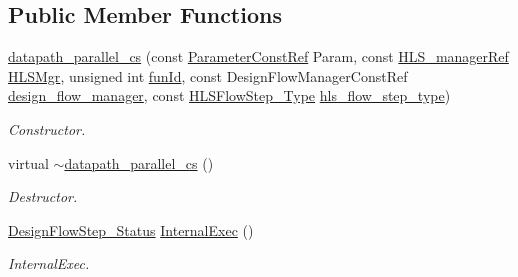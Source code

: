 \subsection*{Public Member Functions}
\begin{DoxyCompactItemize}
\item 
\hyperlink{classdatapath__parallel__cs_ae38b414a0819ea8ddd0ed31d7f10e3b7}{datapath\+\_\+parallel\+\_\+cs} (const \hyperlink{Parameter_8hpp_a37841774a6fcb479b597fdf8955eb4ea}{Parameter\+Const\+Ref} Param, const \hyperlink{hls__manager_8hpp_acd3842b8589fe52c08fc0b2fcc813bfe}{H\+L\+S\+\_\+manager\+Ref} \hyperlink{classHLS__step_ade85003a99d34134418451ddc46a18e9}{H\+L\+S\+Mgr}, unsigned int \hyperlink{classHLSFunctionStep_a3e6434fd86c698b0c70520b859bff5b0}{fun\+Id}, const Design\+Flow\+Manager\+Const\+Ref \hyperlink{classDesignFlowStep_ab770677ddf087613add30024e16a5554}{design\+\_\+flow\+\_\+manager}, const \hyperlink{hls__step_8hpp_ada16bc22905016180e26fc7e39537f8d}{H\+L\+S\+Flow\+Step\+\_\+\+Type} \hyperlink{classHLS__step_aefd59af15346ec3f10bf12bd756e6777}{hls\+\_\+flow\+\_\+step\+\_\+type})
\begin{DoxyCompactList}\small\item\em Constructor. \end{DoxyCompactList}\item 
virtual \hyperlink{classdatapath__parallel__cs_a6af0c1233e253a225e37aa2f1677524b}{$\sim$datapath\+\_\+parallel\+\_\+cs} ()
\begin{DoxyCompactList}\small\item\em Destructor. \end{DoxyCompactList}\item 
\hyperlink{design__flow__step_8hpp_afb1f0d73069c26076b8d31dbc8ebecdf}{Design\+Flow\+Step\+\_\+\+Status} \hyperlink{classdatapath__parallel__cs_a62fb8804158d6c6dcf922065f09c688f}{Internal\+Exec} ()
\begin{DoxyCompactList}\small\item\em Internal\+Exec. \end{DoxyCompactList}\end{DoxyCompactItemize}
